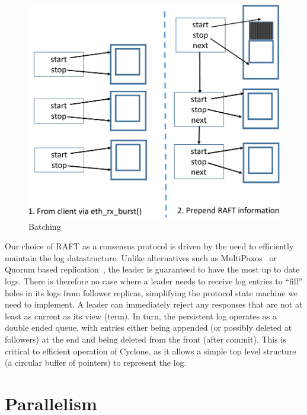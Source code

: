 \documentclass[twocolumn]{article}
\begin{document}
\begin{figure}
  \centering
  \includegraphics[scale=0.5]{figures2/batching.pdf}
  \caption{Batching}
  \label{fig:batching}
\end{figure}

Our choice of RAFT as a consensus protocol is driven by the need to efficiently
maintain the log datastructure. Unlike alternatives such as
MultiPaxos~\cite{multipaxos} or Quorum based replication~\cite{quorum}, the
leader is guaranteed to have the most up to date logs. There is therefore no
case where a leader needs to receive log entries to ``fill'' holes in its logs
from follower replicas, simplifying the protocol state machine we need to
implement. A leader can immediately reject any responses that are not at least
as current as its view (term). In turn, the persistent log operates as a double
ended queue, with entries either being appended (or possibly deleted at
followers) at the end and being deleted from the front (after commit). This is
critical to efficient operation of Cyclone, as it allows a simple top level
structure (a circular buffer of pointers) to represent the log.

\section{Parallelism}
\label{sec:parallelism}

\end{document}
